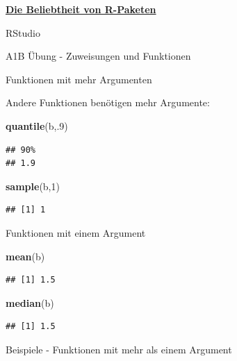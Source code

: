 \documentclass[ignorenonframetext,]{beamer}
\newenvironment{Shaded}{\begin{snugshade}}{\end{snugshade}}
\newcommand{\KeywordTok}[1]{\textcolor[rgb]{0.13,0.29,0.53}{\textbf{#1}}}
\newcommand{\DecValTok}[1]{\textcolor[rgb]{0.00,0.00,0.81}{#1}}
\newcommand{\NormalTok}[1]{#1}
\newcommand{\DecValTok}[1]{\textcolor[rgb]{0.00,0.00,0.81}{#1}}
\newcommand{\KeywordTok}[1]{\textcolor[rgb]{0.13,0.29,0.53}{\textbf{#1}}}
\newcommand{\NormalTok}[1]{#1}
\begin{document}
\begin{frame}{\href{https://gallery.shinyapps.io/cran-gauge/}{\textbf{Die
Beliebtheit von R-Paketen}}}
\begin{frame}{RStudio}
\begin{frame}[fragile]{A1B Übung - Zuweisungen und Funktionen}
\begin{frame}[fragile]{Funktionen mit mehr Argumenten}
\begin{block}{Andere Funktionen benötigen mehr Argumente:}
\begin{Shaded}
\begin{Highlighting}[]
\KeywordTok{quantile}\NormalTok{(b,.}\DecValTok{9}\NormalTok{)}
\end{Highlighting}
\end{Shaded}

\begin{verbatim}
## 90% 
## 1.9
\end{verbatim}

\begin{Shaded}
\begin{Highlighting}[]
\KeywordTok{sample}\NormalTok{(b,}\DecValTok{1}\NormalTok{) }
\end{Highlighting}
\end{Shaded}

\begin{verbatim}
## [1] 1
\end{verbatim}

\end{block}

\end{frame}

\begin{frame}[fragile]{Funktionen mit einem Argument}
\protect\hypertarget{funktionen-mit-einem-argument}{}

\begin{Shaded}
\begin{Highlighting}[]
\KeywordTok{mean}\NormalTok{(b)}
\end{Highlighting}
\end{Shaded}

\begin{verbatim}
## [1] 1.5
\end{verbatim}

\begin{Shaded}
\begin{Highlighting}[]
\KeywordTok{median}\NormalTok{(b)}
\end{Highlighting}
\end{Shaded}

\begin{verbatim}
## [1] 1.5
\end{verbatim}

\end{frame}

\begin{frame}[fragile]{Beispiele - Funktionen mit mehr als einem
Argument}
\protect\hypertarget{beispiele---funktionen-mit-mehr-als-einem-argument}{}


\end{frame}
\end{frame}
\end{frame}
\end{frame}
\end{document}
